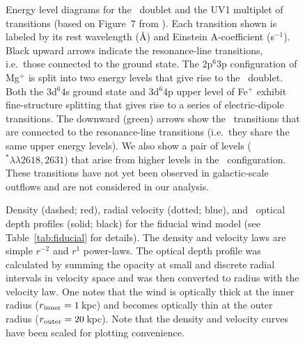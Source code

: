 \documentclass[12pt,preprint]{aastex}
\begin{document}
\begin{figure}
\caption{
Energy level diagrams for the \mgiid\ doublet and the UV1
multiplet of  transitions   
(based on Figure~7 from \cite{hmt+99}).
Each transition shown is
labeled by its rest wavelength (\AA) and Einstein A-coefficient
(s$^{-1}$). Black upward arrows
indicate the resonance-line transitions, i.e.\ those connected to the ground
state.  The 2p$^6$3p configuration of Mg$^+$ is split into
two energy levels that give rise to the \mgiid\ doublet.  
Both the 3d$^6$4s ground state and 3d$^6$4p upper level of Fe$^+$
exhibit fine-structure splitting that gives rise to a series of
electric-dipole transitions. 
The downward (green) arrows show the \feiis\ transitions that are connected to the
resonance-line transitions (i.e.\ they share the same upper energy
levels).  We also show a pair of levels ($^* \lambda\lambda
2618,2631$) that arise from higher levels in the \zconfig\
configuration.  These transitions have not yet been observed in
galactic-scale outflows and are not considered in our analysis.
}
\label{fig:energy}
\end{figure}

\begin{figure}
\caption{
Density (dashed; red), radial velocity (dotted; blue), and
\mgiia\ optical depth profiles (solid; black) for the fiducial
wind model (see Table~\ref{tab:fiducial} for details).
The density and velocity laws are simple $r^{-2}$ and $r^1$
power-laws.  The optical depth profile was calculated by summing
the opacity at small and discrete radial intervals in velocity space
and was then converted to radius with the velocity law.  One notes that
the wind is optically thick at the inner radius ($r_{\rm inner} =
1$\,kpc) and becomes optically thin at the outer radius ($r_{\rm
  outer} = 20$\,kpc).
Note that the density and velocity curves have been scaled for plotting
convenience.  
}
\label{fig:fiducial_nvt}
\end{figure}
\end{document}

